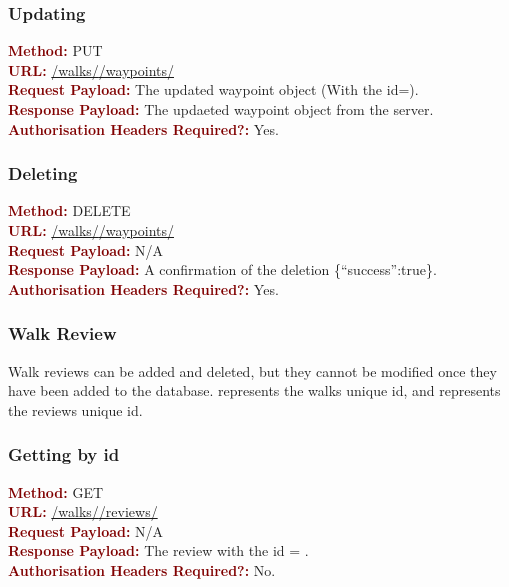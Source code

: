 \documentclass[11pt,a4paper]{report}
\begin{document}
\subsubsection{Updating}
\textbf{\textcolor{Maroon}{Method:}} PUT\\
\textbf{\textcolor{Maroon}{URL:}} \url{/walks/}\url{/waypoints/}\\
\textbf{\textcolor{Maroon}{Request Payload:}} The updated waypoint object (With the id=).\\
\textbf{\textcolor{Maroon}{Response Payload:}} The updaeted waypoint object from the server.\\
\textbf{\textcolor{Maroon}{Authorisation Headers Required?:}} Yes.

\subsubsection{Deleting}
\textbf{\textcolor{Maroon}{Method:}} DELETE\\
\textbf{\textcolor{Maroon}{URL:}} \url{/walks/}\url{/waypoints/}\\
\textbf{\textcolor{Maroon}{Request Payload:}} N/A\\
\textbf{\textcolor{Maroon}{Response Payload:}} A confirmation of the deletion \{``success'':true\}.\\
\textbf{\textcolor{Maroon}{Authorisation Headers Required?:}} Yes.

\subsubsection{Walk Review}

Walk reviews can be added and deleted, but they cannot be modified once they have been added to the database.  represents the walks unique id, and  represents the reviews unique id.

\subsubsection{Getting by id}
\textbf{\textcolor{Maroon}{Method:}} GET\\
\textbf{\textcolor{Maroon}{URL:}} \url{/walks/}\url{/reviews/}\\
\textbf{\textcolor{Maroon}{Request Payload:}} N/A\\
\textbf{\textcolor{Maroon}{Response Payload:}} The review with the id = .\\
\textbf{\textcolor{Maroon}{Authorisation Headers Required?:}} No.
\end{document}
